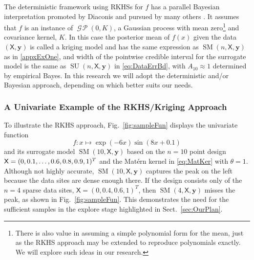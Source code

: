 \documentclass[11pt]{NSFamsart}
\DeclareMathOperator{\GP}{\mathcal{G} \! \mathcal{P}}
\DeclareMathOperator{\SURR}{SM} %
\DeclareMathOperator{\SURRERR}{SU}
\newcommand{\mX}{\mathsf{X}}
\newcommand{\by}{{\boldsymbol{y}}}
\begin{document}
The deterministic framework using RKHSs for $f$ has a parallel Bayesian interpretation promoted by Diaconis \cite{Dia88a} and pursued by many others \cite{BriEtal18a, OHa91a, OwhEtal19a, RasWil06a, Rit00a}.  It assumes that $f$ is an instance of $\GP(0,K)$, a Gaussian process with mean zero\footnote{There is also value in assuming a simple polynomial form for the mean, just as the RKHS approach may be extended to reproduce polynomials exactly. We will explore such ideas in our research.} and covariance kernel, $K$.  In this case the posterior mean of $f(x)$ given the data $(\mX,\by)$ is called a kriging model and has the same expression as $\SURR(n,\mX,\by)$ as in \eqref{appxExOne}, and width of the pointwise credible interval for the surrogate model is the same as $\SURRERR(n,\mX,\by)$ in \eqref{eq:DataErrBd}, with $A_{10} \approx 1$ determined by empirical Bayes.  In this research we will adopt the deterministic and/or Bayesian approach, depending on which better suits our needs.

\subsubsection{A Univariate Example of the RKHS/Kriging Approach} \label{sec:UnivarEx}

To illustrate the RKHS approach, Fig.\ \ref{fig:sampleFun} displays the univariate function
\begin{equation} \label{eq:univarfun}
f \colon x \mapsto \exp(-6x) \sin(8x+0.1)
\end{equation}
and its surrogate model $\SURR(10,\mX,\by)$ based on the $n=10$ point design $\mX = (0, 0.1, \ldots, 0.6, 0.8,\linebreak 0.9, 1)^T$ and the Mat\'ern kernel in \eqref{eq:MatKer} with $\theta =1$.  
Although not highly accurate, $\SURR(10,\mX,\by)$ captures the peak on the left because the data sites are dense enough there.  If the design consists only of the $n=4$ sparse data sites, $\mX = (0, 0.4,  0.6, 1)^T$, then $\SURR(4,\mX,\by)$ misses the peak, as shown in Fig.\ \ref{fig:sampleFun}. This demonstrates the need for the sufficient samples in the explore stage highlighted in Sect.\ \ref{sec:OurPlan}. 
\end{document}
